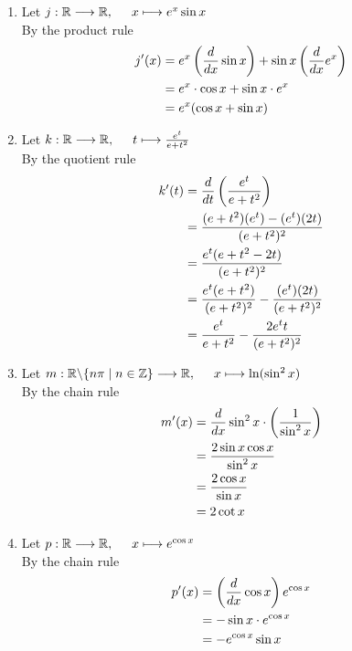 \documentclass[12pt]{amsart}
\begin{document}
\begin{enumerate}
\begin{enumerate}
			\item Let $j: \mathbb{R}\longrightarrow\mathbb{R}, \hspace{0.5cm} x\longmapsto e^x\sin x$ \\
				By the product rule
				\begin{align}
					j'(x) & = e^x \left(\frac{ d}{dx} \sin x\right) + \sin x \left(\frac { d}{dx} e^x \right) \notag \\
					& = e^x\cdot \cos x + \sin x \cdot e^x \notag \\
					& = e^x(\cos x+ \sin x) \notag 
				\end{align}
			
			\item Let $k: \mathbb{R}\longrightarrow\mathbb{R}, \hspace{0.5cm} t\longmapsto 
				\frac{e^t}{e+t^2}$ \\
				By the quotient rule
				\begin{align}
					k'(t) & = \frac{ d}{dt}\left(\frac{e^t}{e+t^2}\right) \notag \\
					& = \frac{(e+t^2)(e^t) - (e^t)(2t)}{(e+t^2)^2} \notag \\
					& = \frac{e^t(e+t^2-2t)}{(e+t^2)^2} \notag \\
					& = \frac{e^t(e+t^2)}{(e+t^2)^2} - \frac{(e^t)(2t)}{(e+t^2)^2} \notag \\
					& = \frac{e^t}{e+t^2} - \frac{2e^t t}{(e+t^2)^2} \notag
				\end{align}
			
			\item Let $m: \mathbb{R} \backslash \{n\pi \mid n \in \mathbb{Z} \} \longrightarrow\mathbb{R}, 					\hspace{0.5cm} x\longmapsto \ln(\sin^2x)$\\
				By the chain rule
				\begin{align}
					m'(x) & = \frac{ d}{dx} \sin^2x \cdot \left(\frac{1}{\sin^2 x}\right) \notag \\
					& = \frac{2 \sin x \cos x}{\sin^2 x} \notag \\
					& = \frac{2 \cos x}{\sin x} \notag \\
					& = 2 \cot x \notag
				\end{align}
			
			\item Let $p: \mathbb{R}\longrightarrow\mathbb{R}, \hspace{0.5cm} x\longmapsto e^{\cos x}$\\
				By the chain rule
				\begin{align}
					p'(x) & = \left(\frac{ d}{dx} \cos x\right) e^{\cos x} \notag \\
					& = -\sin x \cdot e^{\cos x} \notag \\
					& = -e^{\cos x} \sin x \notag
				\end{align}
				

\end{enumerate}
\end{enumerate}
\end{document}
